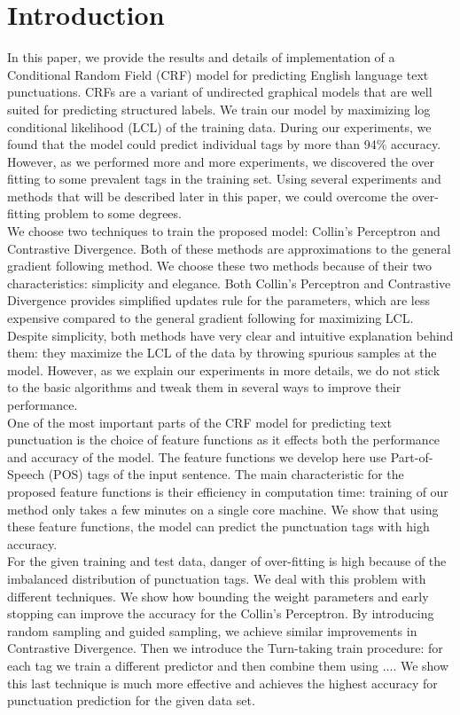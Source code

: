 \documentclass[twoside,12pt]{article}
\begin{document}
\section{Introduction}
In this paper, we provide the results and details of implementation of a Conditional Random Field (CRF) model for predicting English language text punctuations. CRFs are a variant of undirected graphical models that are well suited for predicting structured labels. We train our model by maximizing log conditional likelihood (LCL) of the training data. During our experiments, we found that the model could predict individual tags by more than 94\% accuracy. However, as we performed more and more experiments, we discovered the over fitting to some prevalent tags in the training set. Using several experiments and methods that will be described later in this paper, we could overcome the over-fitting problem to some degrees.\\
We choose two techniques to train the proposed model: Collin's Perceptron and Contrastive Divergence. Both of these methods are approximations to the general gradient following method. We choose these two methods because of their two characteristics: simplicity and elegance. Both Collin's Perceptron and Contrastive Divergence provides simplified updates rule for the parameters, which are less expensive compared to the general gradient following for maximizing LCL. Despite simplicity, both methods have very clear and intuitive explanation behind them: they maximize the LCL of the data by throwing spurious samples at the model. However, as we explain our experiments in more details, we do not stick to the basic algorithms and tweak them in several ways to improve their performance.\\
One of the most important parts of the CRF model for predicting text punctuation is the choice of feature functions as it effects both the performance and accuracy of the model. The feature functions we develop here use Part-of-Speech (POS) tags of the input sentence. The main characteristic for the proposed feature functions is their efficiency in computation time: training of our method only takes a few minutes on a single core machine. We show that using these feature functions, the model can predict the punctuation tags with high accuracy.\\ 
For the given training and test data, danger of over-fitting is high because of the imbalanced distribution of punctuation tags. We deal with this problem with different techniques. We show how bounding the weight parameters and early stopping can improve the accuracy for the Collin's Perceptron. By introducing random sampling and guided sampling, we achieve similar improvements in Contrastive Divergence. Then we introduce the Turn-taking train procedure: for each tag we train a different predictor and then combine them using .... We show this last technique is much more effective and achieves the highest accuracy for punctuation prediction for the given data set.
\end{document}
